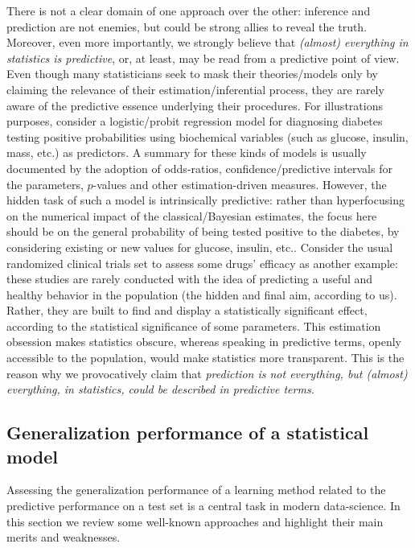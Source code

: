 \documentclass{statsoc}
\begin{document}
There is not a clear domain of one approach over the other: inference and prediction are not enemies, but could be strong 
allies to reveal the truth.  Moreover, even more importantly, we strongly believe that \emph{(almost) everything in statistics is predictive}, or, at 
least, may be read from a predictive point of view. Even though many statisticians seek to mask their theories/models only by claiming the 
relevance of their estimation/inferential process, they are rarely aware of the predictive essence underlying their procedures. For illustrations 
purposes, consider a logistic/probit regression model for diagnosing diabetes testing positive probabilities using biochemical variables (such as glucose, insulin, mass, etc.) as predictors. A summary for these kinds of models 
is usually documented by the adoption of odds-ratios, confidence/predictive intervals for the parameters, $p$-values and other estimation-driven 
measures. However, the hidden task of such a model is intrinsically predictive: rather than hyperfocusing on the numerical impact of the 
classical/Bayesian estimates, the focus here should be on the general probability of being tested positive to the diabetes, by considering 
existing or new  values for glucose, insulin, etc.. Consider the usual randomized clinical trials set to assess some drugs' 
efficacy as another example: these studies are rarely conducted with the idea of predicting a useful and healthy behavior in the population (the hidden and final aim, according 
to us). Rather, they are built to find and display a statistically significant effect, according to the statistical significance of some parameters. This estimation obsession makes statistics obscure, whereas speaking in predictive terms, openly accessible to the population, would make statistics more transparent.
This is the reason why we provocatively claim that \emph{prediction is not everything, but (almost) everything, in statistics, could be described in predictive terms.}


\subsection{Generalization performance of a statistical model}

Assessing the generalization performance of a learning method related to the predictive performance on a test set is a central task in modern data-science. In this section we review some well-known approaches and highlight their main merits and weaknesses.
\end{document}

